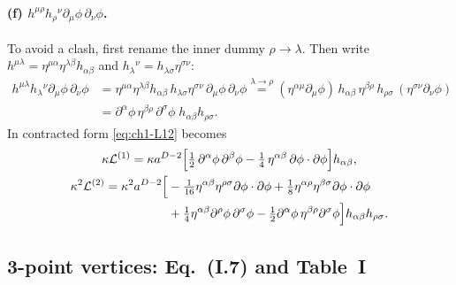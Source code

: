 \paragraph{(f) $h^{\mu\rho}h_\rho{}^\nu\partial_\mu\phi\,\partial_\nu\phi$.} To
avoid a clash, first rename the inner dummy $\rho\to\lambda$. Then write
$h^{\mu\lambda}=\eta^{\mu\alpha}\eta^{\lambda\beta}h_{\alpha\beta}$ and
$h_\lambda{}^\nu=h_{\lambda\sigma}\eta^{\sigma\nu}$:
\begin{equation}
\begin{aligned}
h^{\mu\lambda}h_\lambda{}^\nu\partial_\mu\phi\,\partial_\nu\phi
&=\eta^{\mu\alpha}\eta^{\lambda\beta}h_{\alpha\beta}\,h_{\lambda\sigma}\eta^{\sigma\nu}\,\partial_\mu\phi\,\partial_\nu\phi
\overset{\lambda\to\rho}{=}(\eta^{\alpha\mu}\partial_\mu\phi)\,h_{\alpha\beta}\,\eta^{\beta\rho}\,h_{\rho\sigma}\,(\eta^{\sigma\nu}\partial_\nu\phi)\\
&=\partial^\alpha\phi\,\eta^{\beta\rho}\,\partial^\sigma\phi\;h_{\alpha\beta}h_{\rho\sigma}.
\end{aligned}
\label{eq:ch1-cf}
\end{equation}
In contracted form \eqref{eq:ch1-L12} becomes
\begin{gather}
\kappa\mathcal L^{(1)}=\kappa a^{D-2}\Big[\tfrac12\,\partial^\alpha\phi\,\partial^\beta\phi-\tfrac14\,\eta^{\alpha\beta}\,\partial\phi\cdot\partial\phi\Big]h_{\alpha\beta},
\label{eq:ch1-L1c}\\
\begin{aligned}
\kappa^2\mathcal L^{(2)}=\kappa^2a^{D-2}\Big[&-\tfrac1{16}\eta^{\alpha\beta}\eta^{\rho\sigma}\partial\phi\cdot\partial\phi+\tfrac18\eta^{\alpha\rho}\eta^{\beta\sigma}\partial\phi\cdot\partial\phi\\
&+\tfrac14\eta^{\alpha\beta}\partial^\rho\phi\,\partial^\sigma\phi-\tfrac12\partial^\alpha\phi\,\eta^{\beta\rho}\partial^\sigma\phi\Big]h_{\alpha\beta}h_{\rho\sigma}.
\end{aligned}
\label{eq:ch1-L2c}
\end{gather}

\subsection{3-point vertices: Eq.~(I.7) and Table~I}
\label{sec:ch1-t2-3pt}

